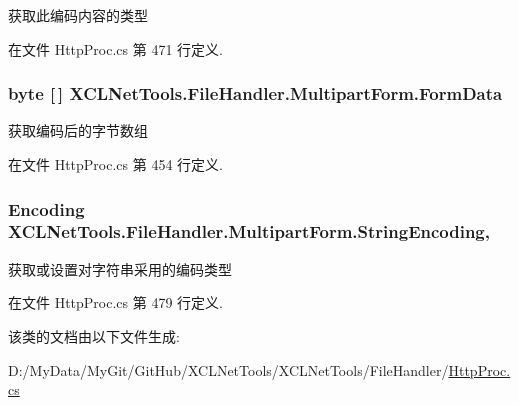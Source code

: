 获取此编码内容的类型 



在文件 Http\-Proc.\-cs 第 471 行定义.

\hypertarget{class_x_c_l_net_tools_1_1_file_handler_1_1_multipart_form_ad540886372239dbb4fcc975e694be5d9}{
\subsubsection[{Form\-Data}]{\setlength{\rightskip}{0pt plus 5cm}byte \mbox{[}$\,$\mbox{]} X\-C\-L\-Net\-Tools.\-File\-Handler.\-Multipart\-Form.\-Form\-Data\hspace{0.3cm}{\ttfamily [get]}}}\label{class_x_c_l_net_tools_1_1_file_handler_1_1_multipart_form_ad540886372239dbb4fcc975e694be5d9}


获取编码后的字节数组 



在文件 Http\-Proc.\-cs 第 454 行定义.

\hypertarget{class_x_c_l_net_tools_1_1_file_handler_1_1_multipart_form_ade83206c0e41ad24ba543ebd89e0281f}{
\subsubsection[{String\-Encoding}]{\setlength{\rightskip}{0pt plus 5cm}Encoding X\-C\-L\-Net\-Tools.\-File\-Handler.\-Multipart\-Form.\-String\-Encoding\hspace{0.3cm}{\ttfamily [get]}, {\ttfamily [set]}}}\label{class_x_c_l_net_tools_1_1_file_handler_1_1_multipart_form_ade83206c0e41ad24ba543ebd89e0281f}


获取或设置对字符串采用的编码类型 



在文件 Http\-Proc.\-cs 第 479 行定义.



该类的文档由以下文件生成\-:\begin{DoxyCompactItemize}
\item 
D\-:/\-My\-Data/\-My\-Git/\-Git\-Hub/\-X\-C\-L\-Net\-Tools/\-X\-C\-L\-Net\-Tools/\-File\-Handler/\hyperlink{_http_proc_8cs}{Http\-Proc.\-cs}\end{DoxyCompactItemize}
